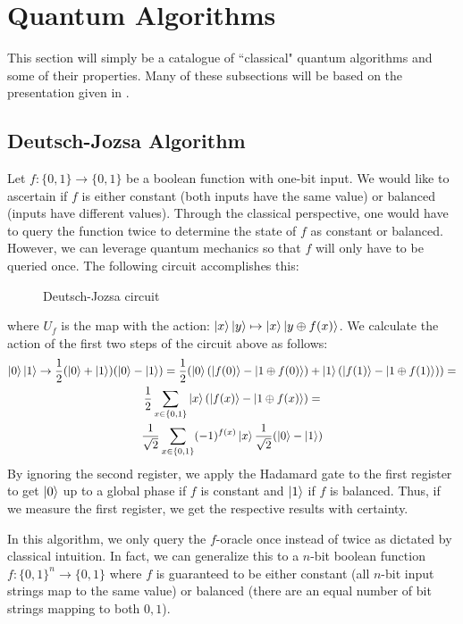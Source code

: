 \documentclass{../quantum.tex}
\begin{document}
\section{Quantum Algorithms}

This section will simply be a catalogue of ``classical" quantum algorithms and some of their properties. Many of these subsections will be based on the presentation given in \cite{childs17}.

\subsection{Deutsch-Jozsa Algorithm}
Let $f: \{0,1\} \rightarrow \{0,1\}$ be a boolean function with one-bit input. We would like to ascertain if $f$ is either constant (both inputs have the same value) or balanced (inputs have different values). Through the classical perspective, one would have to query the function twice to determine the state of $f$ as constant or balanced. However, we can leverage quantum mechanics so that $f$ will only have to be queried once.
%
The following circuit accomplishes this:

\begin{figure}[ht]
    \centering
    \leavevmode
    \caption{Deutsch-Jozsa circuit}
\end{figure}
%
where $U_f$ is the map with the action: $\ket{x}\ket{y} \mapsto \ket{x}\ket{y \oplus f(x)}$. We calculate the action of the first two steps of the circuit above as follows:
%
\begin{gather}
  \ket{0}\ket{1} \rightarrow \frac{1}{2}(\ket{0} + \ket{1})(\ket{0} - \ket{1}) = \frac{1}{2}(\ket{0}(\ket{f(0)} - \ket{1 \oplus f(0)}) + \ket{1}(\ket{f(1)} - \ket{1 \oplus f(1)})) = \\
  \frac{1}{2}\sum_{x \in \{0,1\}} \ket{x}(\ket{f(x)} - \ket{1 \oplus f(x)}) = \\
  \frac{1}{\sqrt{2}} \sum_{x \in \{0,1\}} (-1)^{f(x)}\ket{x} \frac{1}{\sqrt{2}}(\ket{0} -
  \ket{1})
\end{gather}
By ignoring the second register, we apply the Hadamard gate to the first register to get $\ket{0}$ up to a global phase if $f$ is constant and $\ket{1}$ if $f$ is balanced. Thus, if we measure the first register, we get the respective results with certainty.

In this algorithm, we only query the $f$-oracle once instead of twice as dictated by classical intuition. In fact, we can generalize this to a $n$-bit boolean function $f:\{0,1\}^n \rightarrow \{0,1\}$ where $f$ is guaranteed to be either constant (all $n$-bit input strings map to the same value) or balanced (there are an equal number of bit strings mapping to both $0,1$).
\end{document}
